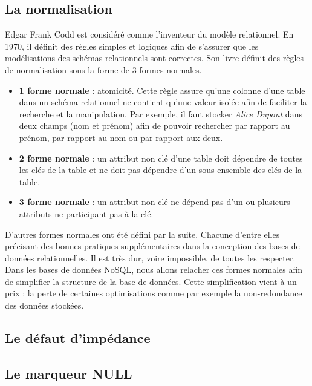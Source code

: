\subsection{La normalisation}

    Edgar Frank Codd est considéré comme l'inventeur du modèle relationnel. En 1970, il définit des règles simples et logiques afin de s'assurer que les modélisations des schémas relationnels sont correctes\cite{Wikipedia_Edgar_Frank_Codd}. Son livre définit des règles de normalisation sous la forme de 3 formes normales.
    \vspace{10px}
    \begin{itemize}
      \item \textbf{1\iere{} forme normale} : atomicité. Cette règle assure qu'une colonne d'une table dans un schéma relationnel ne contient qu'une valeur isolée afin de faciliter la recherche et la manipulation. Par exemple, il faut stocker \textit{Alice Dupont} dans deux champs (nom et prénom) afin de pouvoir rechercher par rapport au prénom, par rapport au nom ou par rapport aux deux.
      \item \textbf{2\ieme{} forme normale} : un attribut non clé d'une table doit dépendre de toutes les clés de la table et ne doit pas dépendre d'un sous-ensemble des clés de la table.
      \item \textbf{3\ieme{} forme normale} : un attribut non clé ne dépend pas d'un ou plusieurs attributs ne participant pas à la clé.
    \end{itemize}
    \vspace{20px}
    D'autres formes normales ont été défini par la suite. Chacune d'entre elles précisant des bonnes pratiques supplémentaires dans la conception des bases de données relationnelles. Il est très dur, voire impossible, de toutes les respecter. Dans les bases de données NoSQL, nous allons relacher ces formes normales afin de simplifier la structure de la base de données. Cette simplification vient à un prix : la perte de certaines optimisations comme par exemple la non-redondance des données stockées.

\subsection{Le défaut d'impédance}



\subsection{Le marqueur NULL}


